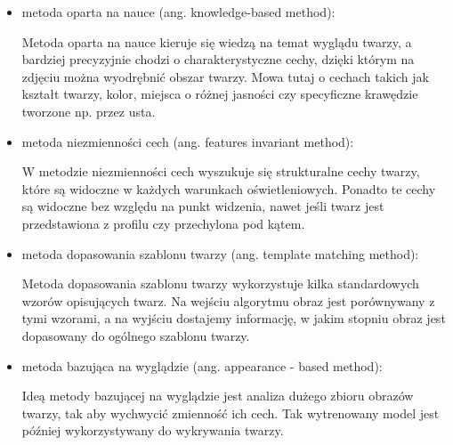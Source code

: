 \documentclass[a4paper,twoside,12pt]{book}
\begin{document}
    \begin{itemize}
        \item metoda oparta na nauce (ang. knowledge-based method):

        Metoda oparta na nauce kieruje się wiedzą na temat wyglądu twarzy, a
        bardziej precyzyjnie chodzi o charakterystyczne cechy,
        dzięki którym na zdjęciu można wyodrębnić obszar twarzy.
        Mowa tutaj o cechach takich jak kształt twarzy, kolor, miejsca o różnej jasności czy specyficzne krawędzie
        tworzone np. przez
        usta.
        \item metoda niezmienności cech (ang. features invariant method):

        W metodzie niezmienności cech wyszukuje się strukturalne cechy twarzy, które są widoczne w każdych warunkach
        oświetleniowych.
        Ponadto te cechy są widoczne bez względu na punkt widzenia, nawet jeśli twarz jest przedstawiona
        z profilu czy przechylona pod kątem.
        \item metoda dopasowania szablonu twarzy (ang. template matching method):

        Metoda dopasowania szablonu twarzy wykorzystuje kilka standardowych wzorów opisujących twarz.
        Na wejściu algorytmu obraz jest porównywany z tymi wzorami, a
        na wyjściu dostajemy informację, w jakim stopniu obraz jest dopasowany do ogólnego szablonu twarzy.
        \item metoda bazująca na wyglądzie (ang. appearance - based method):

        Ideą metody bazującej na wyglądzie jest analiza dużego zbioru obrazów twarzy, tak aby wychwycić zmienność
        ich cech.
        Tak wytrenowany model jest później wykorzystywany do wykrywania twarzy.
    \end{itemize}

\end{document}
